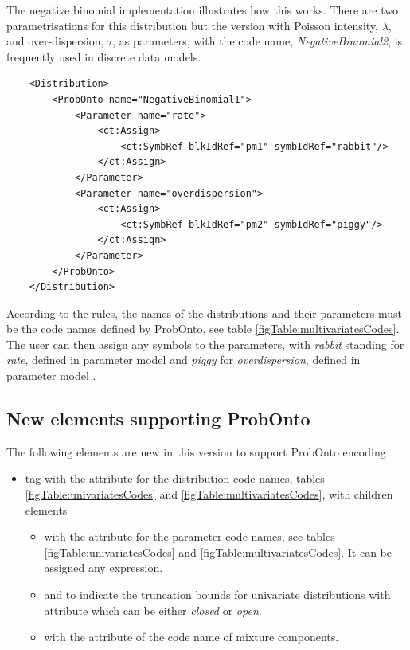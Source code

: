 \begin{example}
The negative binomial implementation illustrates how this works. There are two 
parametrisations for this distribution but the version with Poisson intensity, $\lambda$, 
and over-dispersion, $\tau$, as parameters, with the code name, \emph{NegativeBinomial2}, 
is frequently used in discrete data models.
\lstset{language=XML}
\begin{lstlisting}
    <Distribution>
        <ProbOnto name="NegativeBinomial1">
            <Parameter name="rate">
                <ct:Assign>
                    <ct:SymbRef blkIdRef="pm1" symbIdRef="rabbit"/>
                </ct:Assign>
            </Parameter>
            <Parameter name="overdispersion">
                <ct:Assign>
                    <ct:SymbRef blkIdRef="pm2" symbIdRef="piggy"/>
                </ct:Assign>
            </Parameter>
        </ProbOnto>
    </Distribution>
\end{lstlisting}
%	
According to the rules, the names of the distributions and their parameters 
must be the code names defined by ProbOnto, see table \ref{figTable:multivariatesCodes}. 
The user can then assign any symbols to the parameters,
with \emph{rabbit} standing for \emph{rate}, defined in 
parameter model  and \emph{piggy} for \emph{overdispersion}, 
defined in parameter model .
\end{example}

\subsection{New elements supporting ProbOnto}
The following elements are new in this version to support ProbOnto encoding 
\begin{itemize}
\item
{} tag with the  attribute for the distribution code names, tables 
\ref{figTable:univariatesCodes} and \ref{figTable:multivariatesCodes}, with children elements
\begin{itemize}
\item
{} with the  attribute for the parameter code names, see tables 
\ref{figTable:univariatesCodes} and \ref{figTable:multivariatesCodes}. It can be assigned any expression.
\item
{} and  to indicate the
truncation bounds for univariate distributions with attribute  which can
be either \emph{closed} or \emph{open}.
\item
{} with the  attribute of the code name of mixture 
components.
\end{itemize}
\end{itemize}


